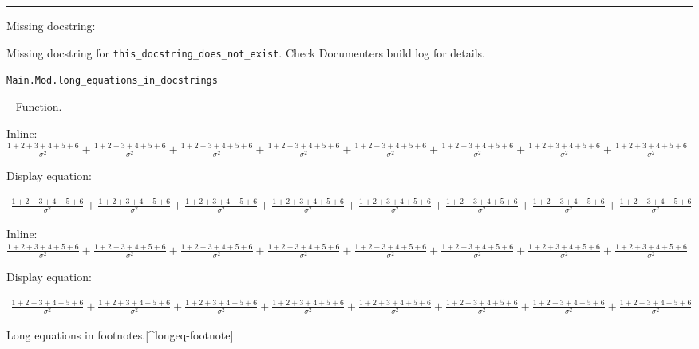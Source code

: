{\rule{\textwidth}{1pt}}


Missing docstring:



\begin{tcolorbox}[colback=admonition-warning!50!white,colframe=admonition-warning,title=\textbf{Missing docstring.}]
Missing docstring for \texttt{this\_docstring\_does\_not\_exist}. Check Documenter{\textquotesingle}s build log for details.

\end{tcolorbox}

\hypertarget{15818938160560313688}{\texttt{Main.Mod.long\_equations\_in\_docstrings}}  -- {Function.}

\begin{adjustwidth}{2em}{0pt}

Inline: \(\frac{1+2+3+4+5+6}{\sigma^2} + \frac{1+2+3+4+5+6}{\sigma^2} + \frac{1+2+3+4+5+6}{\sigma^2} + \frac{1+2+3+4+5+6}{\sigma^2} + \frac{1+2+3+4+5+6}{\sigma^2} + \frac{1+2+3+4+5+6}{\sigma^2} + \frac{1+2+3+4+5+6}{\sigma^2} + \frac{1+2+3+4+5+6}{\sigma^2}\)

Display equation:

\begin{equation*}
\begin{split}\frac{1+2+3+4+5+6}{\sigma^2} + \frac{1+2+3+4+5+6}{\sigma^2} + \frac{1+2+3+4+5+6}{\sigma^2} + \frac{1+2+3+4+5+6}{\sigma^2} + \frac{1+2+3+4+5+6}{\sigma^2} + \frac{1+2+3+4+5+6}{\sigma^2} + \frac{1+2+3+4+5+6}{\sigma^2} + \frac{1+2+3+4+5+6}{\sigma^2}\end{split}\end{equation*}
\begin{tcolorbox}[colback=admonition-note!50!white,colframe=admonition-note,title=\textbf{Long equations in admonitions}]
Inline: \(\frac{1+2+3+4+5+6}{\sigma^2} + \frac{1+2+3+4+5+6}{\sigma^2} + \frac{1+2+3+4+5+6}{\sigma^2} + \frac{1+2+3+4+5+6}{\sigma^2} + \frac{1+2+3+4+5+6}{\sigma^2} + \frac{1+2+3+4+5+6}{\sigma^2} + \frac{1+2+3+4+5+6}{\sigma^2} + \frac{1+2+3+4+5+6}{\sigma^2}\)

Display equation:

\begin{equation*}
\begin{split}\frac{1+2+3+4+5+6}{\sigma^2} + \frac{1+2+3+4+5+6}{\sigma^2} + \frac{1+2+3+4+5+6}{\sigma^2} + \frac{1+2+3+4+5+6}{\sigma^2} + \frac{1+2+3+4+5+6}{\sigma^2} + \frac{1+2+3+4+5+6}{\sigma^2} + \frac{1+2+3+4+5+6}{\sigma^2} + \frac{1+2+3+4+5+6}{\sigma^2}\end{split}\end{equation*}
\end{tcolorbox}
Long equations in footnotes.[{\textasciicircum}longeq-footnote]


\end{adjustwidth}
